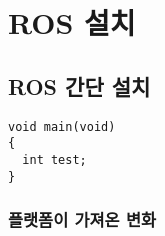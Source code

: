 
\chapter{ROS 설치}

\section{ROS 간단 설치}



\lstset{language=C++}          %

\begin{lstlisting}[frame=single]  % Start your code-block
void main(void)
{
  int test;
}
\end{lstlisting}



\subsection{플랫폼이 가져온 변화}